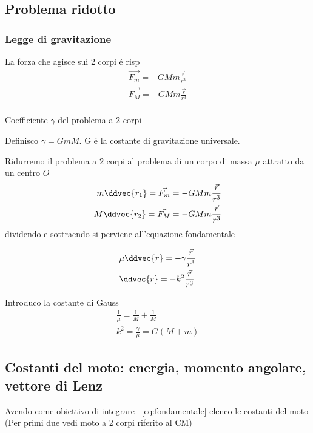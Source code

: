 \documentclass[oneside,12pt,fleqn]{memoir}
\begin{document}
\subsection{Problema ridotto}


\subsubsection{Legge di gravitazione}

La forza che agisce sui 2 corpi \'e risp
\begin{align*}
\vec{F_m}=-GMm\frac{\vec{r}}{r^3}\\
\vec{F_M}=-GMm\frac{\vec{r}}{r^3}\\
\end{align*}

\begin{definition}{Coefficiente $\gamma$ del problema a 2 corpi}

Definisco $\gamma=GmM$. G \'e la costante di gravitazione universale.

\end{definition}


Ridurremo il problema a 2 corpi al problema di un corpo di massa $\mu$ attratto da un centro $O$
\begin{align*}
m\ddvec{r_1}=\vec{F_m}=-GMm\frac{\vec{r}}{r^3}\\
M\ddvec{r_2}=\vec{F_M}=-GMm\frac{\vec{r}}{r^3}\\
\end{align*}
dividendo e sottraendo si perviene all'equazione fondamentale

\begin{align}
&\mu\ddvec{r}=-\gamma\frac{\vec{r}}{r^3}\label{eq:fondamentale}\\
&\ddvec{r}=-k^2\frac{\vec{r}}{r^3}
\end{align}

Introduco la costante di Gauss
\begin{align*}
\frac{1}{\mu}=\frac{1}{M}+\frac{1}{M}\\
k^2=\frac{\gamma}{\mu}=G(M+m)
\end{align*}

\subsection{Costanti del moto: energia, momento angolare, vettore di Lenz}
Avendo come obiettivo di integrare ~\ref{eq:fondamentale} elenco le costanti del moto (Per primi due vedi moto a 2 corpi riferito al CM)
\end{document}
